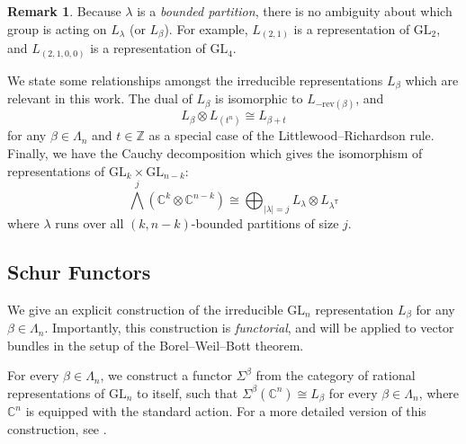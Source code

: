 \documentclass{amsart}
\newcommand\T{\mathsf{T}}
\newcommand\GL{\mathrm{GL}}
\theoremstyle{plain}
\theoremstyle{definition}
\newtheorem{remark}[remark]{Remark}
\numberwithin{equation}{section}
\begin{document}
\begin{remark}
Because $\lambda$ is a \emph{bounded partition}, there is no ambiguity about which group is acting on $L_\lambda$ (or $L_\beta$). For example, $L_{(2,1)}$ is a representation of $\GL_2$, and $L_{(2,1,0,0)}$ is a representation of $\GL_4$.
\end{remark}

We state some relationships amongst the irreducible representations $L_\beta$ which are relevant in this work. The dual of $L_\beta$ is isomorphic to $L_{-\mathrm{rev}(\beta)}$, and
\begin{equation}\label{eq:tensor-shift}
L_\beta\otimes L_{(t^n)}\cong L_{\beta+t}
\end{equation}
for any $\beta\in\Lambda_n$ and $t\in\mathbb{Z}$ as a special case of the Littlewood--Richardson rule. Finally, we have the Cauchy decomposition \cite[Exercise 6.11]{Ful91} which gives the isomorphism of representations of $\GL_k\times\GL_{n-k}$:
\begin{equation}\label{eq:cauchy decomposition}
{\bigwedge}^j\left(\mathbb{C}^k\otimes \mathbb{C}^{n-k}\right)\cong \bigoplus_{|\lambda|=j} L_\lambda\otimes L_{\lambda^\T}
\end{equation}
where $\lambda$ runs over all $(k,n-k)$-bounded partitions of size $j$.


\subsection{Schur Functors}\label{sec:schur}
We give an explicit construction of the irreducible $\GL_n$ representation $L_\beta$ for any $\beta\in\Lambda_n$. Importantly, this construction is \emph{functorial}, and will be applied to vector bundles in the setup of the Borel--Weil--Bott theorem.

For every $\beta\in\Lambda_n$, we construct a functor $\Sigma^\beta$ from the category of rational representations of $\mathrm{GL}_n$ to itself, such that $\Sigma^\beta(\mathbb{C}^n)\cong L_\beta$ for every $\beta\in\Lambda_n$, where $\mathbb{C}^n$ is equipped with the standard action. For a more detailed version of this construction, see \cite[\S6]{Ful91}.
\end{document}
